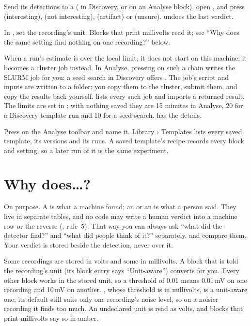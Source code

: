Send its detections to a  (
in Discovery, or  on an Analyse block), open ,
and press  (interesting),  (not interesting),  (artifact) or 
(unsure).  undoes the last verdict.

In , set the recording's unit. Blocks that print millivolts read
it; see ``Why does the same setting find nothing on one recording?'' below.

When a run's estimate is over the local limit, it does not start on this machine; it becomes
a cluster job instead. In Analyse, pressing  on such a chain writes the SLURM job for
you; a seed search in Discovery offers . The job's script and inputs
are written to a folder; you copy them to the cluster, submit them, and copy the results back
yourself.  lists every such job and imports a returned result. The limits
are set in ; with nothing saved they are 15 minutes in Analyse,
20 for a Discovery template run and 10 for a seed search.  has the
details.

Press  on the Analyse toolbar and name it. Library › Templates lists every
saved template, its versions and its runs. A saved template's recipe records every block and
setting, so a later run of it is the same experiment.

\section{Why does\ldots?}\label{sec:faq-why}

On purpose. A  is what a machine found; an
 or an  is what a person said.
They live in separate tables, and no code may write a human verdict into a machine row or the
reverse (, rule~5). That way you can always ask ``what did the detector find?''
and ``what did people think of it?'' separately, and compare them. Your verdict is stored
beside the detection, never over it.

Some recordings are stored in volts and some in millivolts. A block that is told the
recording's unit (its block entry says ``Unit-aware'') converts for you. Every other block
works in the stored unit, so a threshold of 0.01 means 0.01\,mV on one recording and 10\,mV on
another. , whose threshold is in millivolts, is a unit-aware
one; its default still suits only one recording's noise level, so on a noisier recording it
finds too much. An undeclared unit is read as volts, and blocks that print millivolts say so
in amber.

